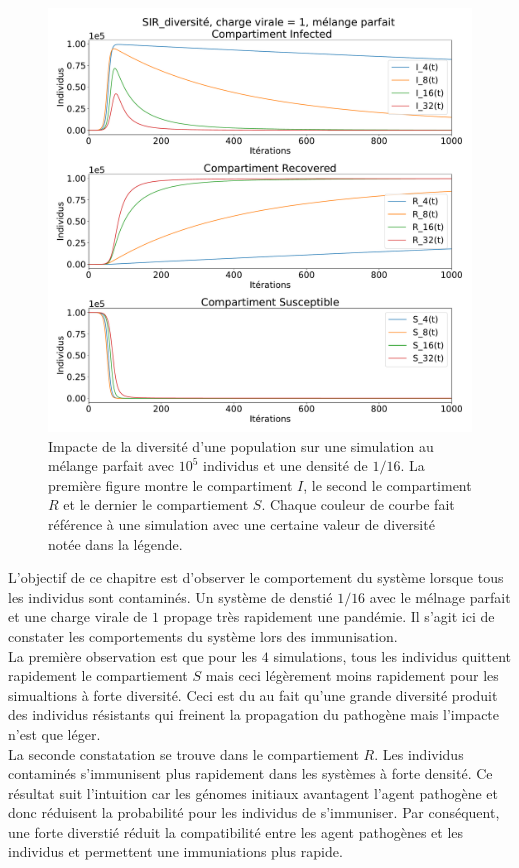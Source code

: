 \newpage

\begin{figure}[h]
	\centering
	\captionsetup{justification=centering}
	\includegraphics[width=.8\textwidth]{Images/SIR_diversite_mix.pdf}
	\caption[Impacte de la diversité]{Impacte de la diversité d'une population sur une simulation au mélange parfait avec $10^5$ individus et une densité de $1/16$. La première figure montre le compartiment $I$, le second le compartiment $R$ et le dernier le compartiement $S$. Chaque couleur de courbe fait référence à une simulation avec une certaine valeur de diversité notée dans la légende.}
\end{figure}

L'objectif de ce chapitre est d'observer le comportement du système lorsque tous les individus sont contaminés. Un système de denstié $1/16$ avec le mélnage parfait et une charge virale de $1$ propage très rapidement une pandémie. Il s'agit ici de constater les comportements du système lors des immunisation.\\

La première observation est que pour les $4$ simulations, tous les individus quittent rapidement le compartiement $S$ mais ceci légèrement moins rapidement pour les simualtions à forte diversité. Ceci est du au fait qu'une grande diversité produit des individus résistants qui freinent la propagation du pathogène mais l'impacte n'est que léger.\\

La seconde constatation se trouve dans le compartiement $R$. Les individus contaminés s'immunisent plus rapidement dans les systèmes à forte densité. Ce résultat suit l'intuition car les génomes initiaux avantagent l'agent pathogène et donc réduisent la probabilité pour les individus de s'immuniser. Par conséquent, une forte diverstié réduit la compatibilité entre les agent pathogènes et les individus et permettent une immuniations plus rapide.

